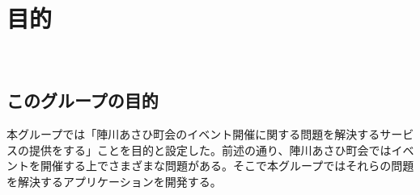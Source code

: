 \chapter{目的}
​
\section{このグループの目的}%
本グループでは「陣川あさひ町会のイベント開催に関する問題を解決するサービスの提供をする」ことを目的と設定した。前述の通り、陣川あさひ町会ではイベントを開催する上でさまざまな問題がある。そこで本グループではそれらの問題を解決するアプリケーションを開発する。
